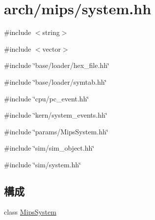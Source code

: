 \hypertarget{arch_2mips_2system_8hh}{
\section{arch/mips/system.hh}
\label{arch_2mips_2system_8hh}
}
{\ttfamily \#include $<$string$>$}\par
{\ttfamily \#include $<$vector$>$}\par
{\ttfamily \#include \char`\"{}base/loader/hex\_\-file.hh\char`\"{}}\par
{\ttfamily \#include \char`\"{}base/loader/symtab.hh\char`\"{}}\par
{\ttfamily \#include \char`\"{}cpu/pc\_\-event.hh\char`\"{}}\par
{\ttfamily \#include \char`\"{}kern/system\_\-events.hh\char`\"{}}\par
{\ttfamily \#include \char`\"{}params/MipsSystem.hh\char`\"{}}\par
{\ttfamily \#include \char`\"{}sim/sim\_\-object.hh\char`\"{}}\par
{\ttfamily \#include \char`\"{}sim/system.hh\char`\"{}}\par
\subsection*{構成}
\begin{DoxyCompactItemize}
\item 
class \hyperlink{classMipsSystem}{MipsSystem}
\end{DoxyCompactItemize}
